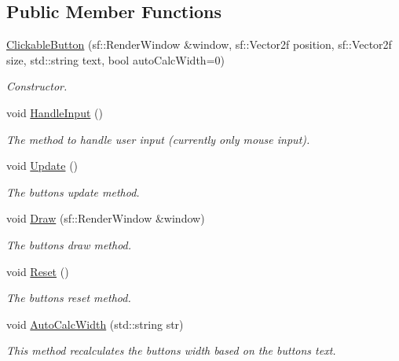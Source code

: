 \subsection*{Public Member Functions}
\begin{DoxyCompactItemize}
\item 
\hyperlink{class_clickable_button_a2941caf8b0b04291cb6ae09df4deb5aa}{Clickable\+Button} (sf\+::\+Render\+Window \&window, sf\+::\+Vector2f position, sf\+::\+Vector2f size, std\+::string text, bool auto\+Calc\+Width=0)
\begin{DoxyCompactList}\small\item\em Constructor. \end{DoxyCompactList}\item 
void \hyperlink{class_clickable_button_a939a1f2a5414c37e9c1c1310db576224}{Handle\+Input} ()
\begin{DoxyCompactList}\small\item\em The method to handle user input (currently only mouse input). \end{DoxyCompactList}\item 
void \hyperlink{class_clickable_button_a393e1529583626f6ee52f0955bd68da8}{Update} ()
\begin{DoxyCompactList}\small\item\em The button\textquotesingle{}s update method. \end{DoxyCompactList}\item 
void \hyperlink{class_clickable_button_a55b5a7b941f25066a8d0481326794b62}{Draw} (sf\+::\+Render\+Window \&window)
\begin{DoxyCompactList}\small\item\em The button\textquotesingle{}s draw method. \end{DoxyCompactList}\item 
void \hyperlink{class_clickable_button_a01ae3f140debdc8b525e1ef745bdbff3}{Reset} ()
\begin{DoxyCompactList}\small\item\em The button\textquotesingle{}s reset method. \end{DoxyCompactList}\item 
void \hyperlink{class_clickable_button_a433c3e53d1ebf7b1ca847e90240b2a5c}{Auto\+Calc\+Width} (std\+::string str)
\begin{DoxyCompactList}\small\item\em This method recalculates the button\textquotesingle{}s width based on the button\textquotesingle{}s text. \end{DoxyCompactList}\item 

\end{DoxyCompactItemize}
